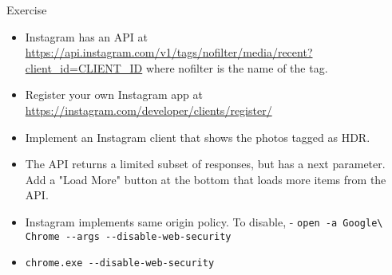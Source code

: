 \documentclass[presentation]{beamer}
\begin{document}
\begin{frame}[fragile,label={sec:orgheadline8}]{Exercise}
 \begin{itemize}
\item Instagram has an API at \url{https://api.instagram.com/v1/tags/nofilter/media/recent?client_id=CLIENT_ID} where nofilter is the name of the tag.
\item Register your own Instagram app at \url{https://instagram.com/developer/clients/register/}
\item Implement an Instagram client that shows the photos tagged as HDR.
\item The API returns a limited subset of responses, but has a next parameter. Add a "Load More" button at the bottom that loads more items from the API.
\item Instagram implements same origin policy. To disable, - \texttt{open -a Google\textbackslash{} Chrome -{}-args -{}-disable-web-security}
\item \texttt{chrome.exe -{}-disable-web-security}
\end{itemize}
\end{frame}
\end{document}
